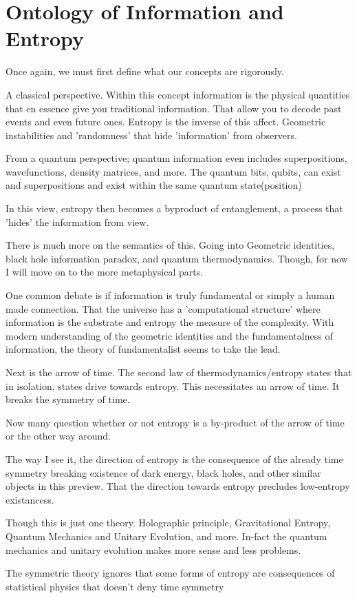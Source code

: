 \section{Ontology of Information and Entropy}
\par Once again, we must first define what our concepts are rigorously.
\par A classical perspective. Within this concept information is the physical quantities that en essence give you traditional information. That allow you to decode past events and even future ones. Entropy is the inverse of this affect. Geometric instabilities and 'randomness' that hide 'information' from observers.
\par From a quantum perspective; quantum information even includes superpositions, wavefunctions, density matrices, and more. The quantum bits, qubits, can exist and superpositions and exist within the same quantum state(position)
\par In this view, entropy then becomes a byproduct of entanglement, a process that 'hides' the information from view.
\par There is much more on the semantics of this. Going into Geometric identities, black hole information paradox, and quantum thermodynamics. Though, for now I will move on to the more metaphysical parts.
\par One common debate is if information is truly fundamental or simply a human made connection. That the universe has a 'computational structure' where information is the substrate and entropy the measure of the complexity. With modern understanding of the geometric identities and the fundamentalness of information, the theory of fundamentalist seems to take the lead.
\par Next is the arrow of time. The second law of thermodynamics/entropy states that in isolation, states drive towards entropy. This necessitates an arrow of time. It breaks the symmetry of time.
\par Now many question whether or not entropy is a by-product of the arrow of time or the other way around.
\par The way I see it, the direction of entropy is the consequence of the already time symmetry breaking existence of dark energy, black holes, and other similar objects in this preview. That the direction towards entropy precludes low-entropy existancess.
\par Though this is just one theory. Holographic principle, Gravitational Entropy, Quantum Mechanics and Unitary Evolution, and more. In-fact the quantum mechanics and unitary evolution makes more sense and less problems.
\par The symmetric theory ignores that some forms of entropy are consequences of statistical physics that doesn't deny time symmetry
